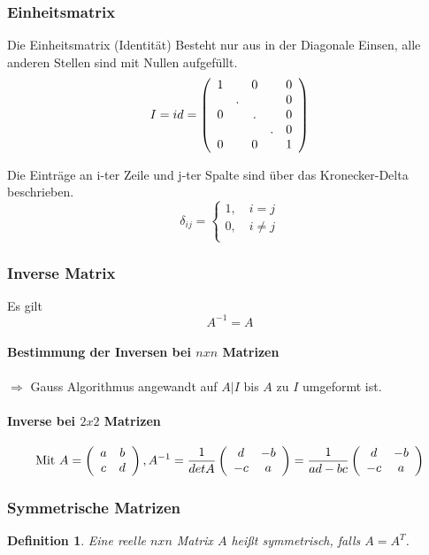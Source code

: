 \documentclass[12pt,a4paper]{article}%
\newtheorem{definition}[satz]{Definition}
\numberwithin{equation}{section}
\newcommand{\subsubsubsection}{\paragraph}
\def\mzxz#1#2#3#4{\left(\begin{array}{c c} #1 & #2 \\ #3 & #4 \\ \end{array}\right)}
\numberwithin{equation}{subsection}
\begin{document}
  \subsubsection{Einheitsmatrix}
  Die Einheitsmatrix (Identität) Besteht nur aus in der Diagonale Einsen, alle anderen Stellen sind mit Nullen aufgefüllt.
  \begin{equation}
    I = id = \left(\begin{array}{c c c c c}
    1 & \; &  0 & \; & 0\\
    \;& .  & \; & \; & 0\\
    0 & \; &  . & \; & 0\\
    \;& \; & \; & .  & 0\\
    0 & \;  & 0 & \; & 1\\
    \end{array}\right)
  \end{equation}
  
  Die Einträge an i-ter Zeile und j-ter Spalte sind über das Kronecker-Delta beschrieben.
  \begin{equation}
    \delta_{ij} = \begin{cases}
	    1,\quad i = j\\
	    0,\quad i\neq j\\
    \end{cases}
  \end{equation}
  
  \subsubsection{Inverse Matrix}
  Es gilt
  \begin{equation}
    A^{-1} = A
  \end{equation}
  \subsubsubsection{Bestimmung der Inversen bei $nxn$ Matrizen}
    $\Rightarrow$ Gauss Algorithmus angewandt auf $A|I$ bis $A$ zu $I$ umgeformt ist.
  \subsubsubsection{Inverse bei $2x2$ Matrizen}
    \begin{equation}
    \text{Mit } A = \left(\begin{array}{c c} a & b \\ c & d \\ \end{array}\right), A^{-1} = \frac{1}{detA} \mzxz{d}{-b}{-c}{a} = \frac{1}{ad-bc} \mzxz{d}{-b}{-c}{a}
    \end{equation}
    
   \subsubsection{Symmetrische Matrizen}
   \begin{definition}
     Eine reelle $nxn$ Matrix $A$ heißt symmetrisch, falls $A = A^T$.
   \end{definition}
   
\end{document}
